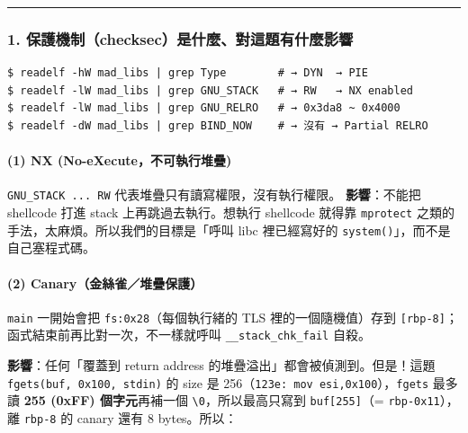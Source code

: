 \documentclass[10pt,a4paper]{article}
\begin{document}
\begin{center}\rule{0.5\linewidth}{0.5pt}\end{center}

\subsubsection{1.
保護機制（checksec）是什麼、對這題有什麼影響}\label{ux4fddux8b77ux6a5fux5236checksecux662fux4ec0ux9ebcux5c0dux9019ux984cux6709ux4ec0ux9ebcux5f71ux97ff}

\begin{Verbatim}[breaklines=true,breakanywhere=true,breakautoindent=false,fontsize=\fontsize{7.0}{9.5}\selectfont]
$ readelf -hW mad_libs | grep Type        # → DYN  → PIE
$ readelf -lW mad_libs | grep GNU_STACK   # → RW   → NX enabled
$ readelf -lW mad_libs | grep GNU_RELRO   # → 0x3da8 ~ 0x4000
$ readelf -dW mad_libs | grep BIND_NOW    # → 沒有 → Partial RELRO
\end{Verbatim}

\paragraph{(1) NX
(No-eXecute，不可執行堆疊)}\label{nx-no-executeux4e0dux53efux57f7ux884cux5806ux758a}

\texttt{GNU\_\allowbreak{}STACK\ \allowbreak{}...\allowbreak{}\ \allowbreak{}RW} 代表堆疊只有讀寫權限，沒有執行權限。
\textbf{影響}：不能把 shellcode 打進 stack 上再跳過去執行。想執行
shellcode 就得靠 \texttt{mprotect}
之類的手法，太麻煩。所以我們的目標是「呼叫 libc 裡已經寫好的
\texttt{system()}」，而不是自己塞程式碼。

\paragraph{(2)
Canary（金絲雀／堆疊保護）}\label{canaryux91d1ux7d72ux96c0ux5806ux758aux4fddux8b77}

\texttt{main} 一開始會把 \texttt{fs:\allowbreak{}0x28}（每個執行緒的 TLS
裡的一個隨機值）存到
\texttt{{[}rbp-\allowbreak{}8{]}}；函式結束前再比對一次，不一樣就呼叫
\texttt{\_\allowbreak{}\_\allowbreak{}stack\_\allowbreak{}chk\_\allowbreak{}fail} 自殺。

\textbf{影響}：任何「覆蓋到 return address
的堆疊溢出」都會被偵測到。但是！這題 \texttt{fgets(buf,\allowbreak{}\ \allowbreak{}0x100,\allowbreak{}\ \allowbreak{}stdin)}
的 size 是 256（\texttt{123e:\allowbreak{}\ \allowbreak{}mov\ \allowbreak{}esi,\allowbreak{}0x100}），\texttt{fgets} 最多讀
\textbf{255 (0xFF) 個字元}再補一個
\texttt{\textquotesingle{}\allowbreak{}\textbackslash{}\allowbreak{}0\textquotesingle{}\allowbreak{}}，所以最高只寫到
\texttt{buf{[}255{]}}（= \texttt{rbp-\allowbreak{}0x11}），離 \texttt{rbp-\allowbreak{}8} 的
canary 還有 8 bytes。所以：
\end{document}

